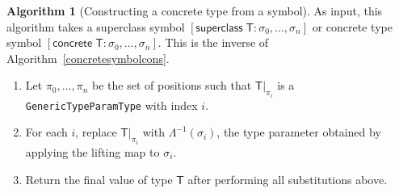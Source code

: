 \documentclass[headsepline,bibliography=totoc]{scrreport}
\newcommand{\namesym}[1]{\mathsf{#1}}
\newcommand{\supersym}[1]{[\mathsf{superclass}\;#1]}
\newcommand{\concretesym}[1]{[\mathsf{concrete}\;#1]}
\theoremstyle{definition}
\theoremstyle{definition}
\theoremstyle{definition}
\newtheorem{algorithm}{Algorithm}[chapter]
\begin{document}
\begin{algorithm}[Constructing a concrete type from a symbol]\label{symboltotype} As input, this algorithm takes a
superclass symbol $\supersym{\namesym{T}\colon\sigma_0,\ldots,\sigma_n}$ or
concrete type symbol $\concretesym{\namesym{T}\colon\sigma_0,\ldots,\sigma_n}$. This is the inverse of Algorithm~\ref{concretesymbolcons}.

\begin{enumerate}
\item Let $\pi_0,\ldots,\pi_n$ be the set of positions such that $\namesym{T}|_{\pi_i}$ is a
\texttt{GenericTypeParamType} with index $i$.
\item For each $i$, replace $\namesym{T}|_{\pi_i}$ with $\Lambda^{-1}(\sigma_i)$, the type
parameter obtained by applying the lifting map to $\sigma_i$.
\item Return the final value of type $\namesym{T}$ after performing all substitutions above.
\end{enumerate}
\end{algorithm}
\end{document}
